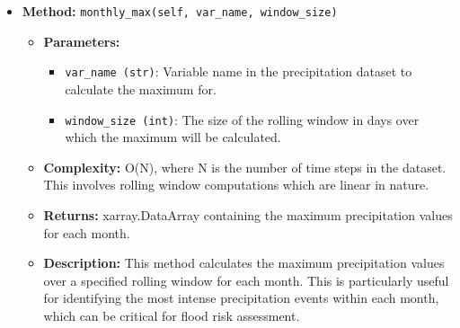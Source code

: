 \documentclass[a4paper,12pt]{article}
\begin{document}
\begin{itemize}
    \item \textbf{Method:} \texttt{monthly\_max(self, var\_name, window\_size)}
    \begin{itemize}
        \item \textbf{Parameters:}
        \begin{itemize}
            \item \texttt{var\_name (str)}: Variable name in the precipitation dataset to calculate the maximum for.
            \item \texttt{window\_size (int)}: The size of the rolling window in days over which the maximum will be calculated.
        \end{itemize}
        \item \textbf{Complexity:} O(N), where N is the number of time steps in the dataset. This involves rolling window computations which are linear in nature.
        \item \textbf{Returns:} xarray.DataArray containing the maximum precipitation values for each month.
        \item \textbf{Description:} This method calculates the maximum precipitation values over a specified rolling window for each month. This is particularly useful for identifying the most intense precipitation events within each month, which can be critical for flood risk assessment.
    \end{itemize}


\end{itemize}
\end{document}

